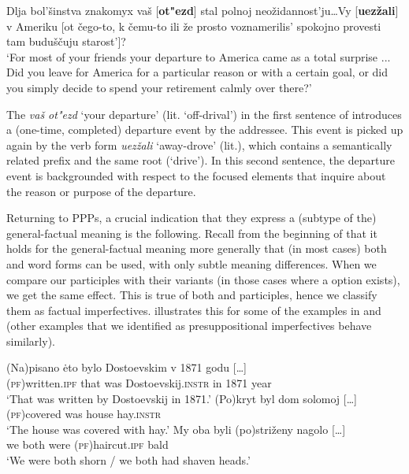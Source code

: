 \documentclass[output=paper,modfonts,newtxmath,hidelinks
\ChapterDOI{10.5281/zenodo.2545513}
]{langscibook}
\begin{document}
\ea Dlja bol'šinstva znakomyx vaš [\textbf{ot"ezd}] stal polnoj  neožidannost'ju\dots Vy [\textbf{uezžali}] v Ameriku [ot čego-to, k čemu-to ili že
	prosto voznamerilis' spokojno provesti tam buduščuju starost']?\\
`For most of your friends your departure to America came as a total surprise ... Did you leave for America for a particular reason or with a certain goal, or did you simply decide to spend your retirement calmly over there?'\label{departure}\hfill \citep[][207f.]{gronndiss}
\z

\noindent The  \textit{vaš ot"ezd} `your departure' (lit. `off-drival') in the first sentence of  introduces a (one-time, completed) departure event by the addressee. This event is picked up again by the  verb form \textit{uezžali} `away-drove' (lit.), which contains a semantically related prefix and the same  root (`drive'). In this second sentence, the departure event is backgrounded with respect to the focused elements that inquire about the reason or purpose of the departure. 

Returning to  PPPs, a crucial indication that they express a (subtype of the) general-factual  meaning is the following. Recall from the beginning of  that it holds for the general-factual meaning more generally that (in most cases) both  and  word forms can be used, with only subtle meaning differences. When we compare our  participles with their  variants (in those cases where a  option exists), we get the same effect. This is true of both  and  participles, hence we classify them as factual imperfectives.  illustrates this for some of the examples in  and  (other examples that we identified as presuppositional imperfectives behave similarly). 

\ea\label{pisanoPF}
\ea\gll	(Na)pisano \.{e}to bylo Dostoevskim v 1871 godu [\dots]\\ 
	(\textsc{pf})written.\textsc{ipf} that was Dostoevskij.\textsc{instr} in 1871 year \\
\glt	`That was written by Dostoevskij in 1871.'
\ex\gll	(Po)kryt byl dom solomoj [\dots]\\ 		
	\textsc{(pf)}covered was house hay.\textsc{instr} 	\\
\glt	`The house was covered with hay.'
\ex\gll	My oba byli (po)striženy nagolo [\dots]\\
	we both were (\textsc{pf})haircut.\textsc{ipf} bald\\
\glt	`We were both shorn / we both had shaven heads.'
\z\z
\end{document}
